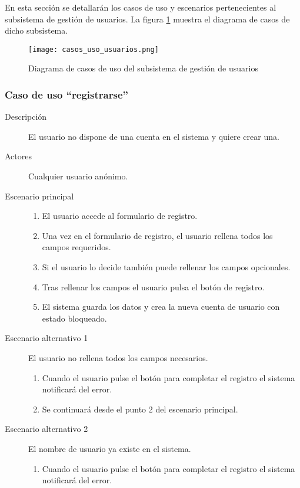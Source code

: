 En esta sección se detallarán los casos de uso y escenarios pertenecientes al subsistema de gestión de usuarios.
La figura \ref{fig:casos_uso_subsistema_usuarios} muestra el diagrama de casos de dicho subsistema.

\begin{figure}[h]
\centering
\texttt{[image: casos\_uso\_usuarios.png]}
\caption{Diagrama de casos de uso del subsistema de gestión de usuarios}
\label{fig:casos_uso_subsistema_usuarios}
\end{figure}


\subsubsection{Caso de uso ``registrarse''}
\begin{description}
\item[Descripción] 				El usuario no dispone de una cuenta en el sistema y quiere crear una.
\item[Actores]					Cualquier usuario anónimo.
\item[Escenario principal]	 	\hfill
								\begin{enumerate}
								\item El usuario accede al formulario de registro.
								\item Una vez en el formulario de registro, el usuario rellena todos los campos requeridos.
								\item Si el usuario lo decide también puede rellenar los campos opcionales.
								\item Tras rellenar los campos el usuario pulsa el botón de registro.
								\item El sistema guarda los datos y crea la nueva cuenta de usuario con estado bloqueado.
								\end{enumerate}
\item[Escenario alternativo 1]	El usuario no rellena todos los campos necesarios.
								\begin{enumerate}
								\item Cuando el usuario pulse el botón para completar el registro el sistema notificará del error.
								\item Se continuará desde el punto 2 del escenario principal.
								\end{enumerate}
\item[Escenario alternativo 2]	El nombre de usuario ya existe en el sistema.
								\begin{enumerate}
								\item Cuando el usuario pulse el botón para completar el registro el sistema notificará del error.

\end{enumerate}
\end{description}
